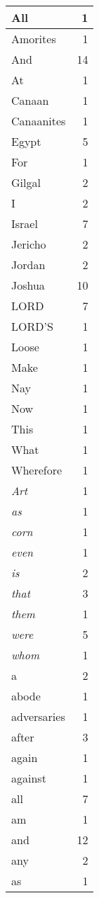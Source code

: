 \begin{center}
\begin{longtable}{l|r}
\hline \hline
\endlastfoot
All & 1 \\ \hline
Amorites & 1 \\ \hline
And & 14 \\ \hline
At & 1 \\ \hline
Canaan & 1 \\ \hline
Canaanites & 1 \\ \hline
Egypt & 5 \\ \hline
For & 1 \\ \hline
Gilgal & 2 \\ \hline
I & 2 \\ \hline
Israel & 7 \\ \hline
Jericho & 2 \\ \hline
Jordan & 2 \\ \hline
Joshua & 10 \\ \hline
LORD & 7 \\ \hline
LORD'S & 1 \\ \hline
Loose & 1 \\ \hline
Make & 1 \\ \hline
Nay & 1 \\ \hline
Now & 1 \\ \hline
This & 1 \\ \hline
What & 1 \\ \hline
Wherefore & 1 \\ \hline
\emph{Art} & 1 \\ \hline
\emph{as} & 1 \\ \hline
\emph{corn} & 1 \\ \hline
\emph{even} & 1 \\ \hline
\emph{is} & 2 \\ \hline
\emph{that} & 3 \\ \hline
\emph{them} & 1 \\ \hline
\emph{were} & 5 \\ \hline
\emph{whom} & 1 \\ \hline
a & 2 \\ \hline
abode & 1 \\ \hline
adversaries & 1 \\ \hline
after & 3 \\ \hline
again & 1 \\ \hline
against & 1 \\ \hline
all & 7 \\ \hline
am & 1 \\ \hline
and & 12 \\ \hline
any & 2 \\ \hline
as & 1 \\ \hline

\end{longtable}
\end{center}
